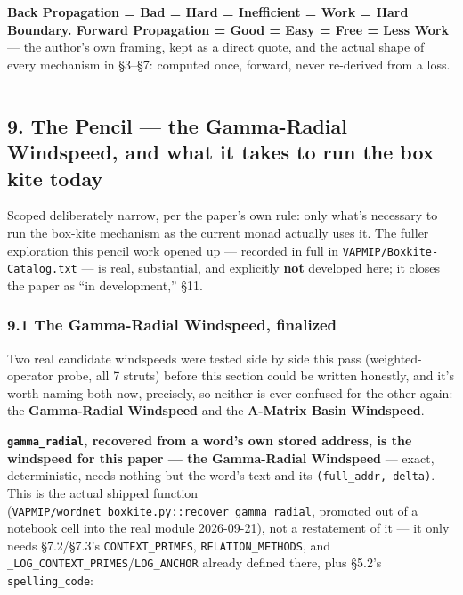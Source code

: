 \documentclass[
  10pt,
]{article}
\begin{document}
\textbf{Back Propagation = Bad = Hard = Inefficient = Work = Hard
Boundary. Forward Propagation = Good = Easy = Free = Less Work} --- the
author's own framing, kept as a direct quote, and the actual shape of
every mechanism in §3--§7: computed once, forward, never re-derived from
a loss.

\begin{center}\rule{0.5\linewidth}{0.5pt}\end{center}

\hypertarget{the-pencil-the-gamma-radial-windspeed-and-what-it-takes-to-run-the-box-kite-today}{%
\subsection{9. The Pencil --- the Gamma-Radial Windspeed, and what it
takes to run the box kite
today}\label{the-pencil-the-gamma-radial-windspeed-and-what-it-takes-to-run-the-box-kite-today}}

Scoped deliberately narrow, per the paper's own rule: only what's
necessary to run the box-kite mechanism as the current monad actually
uses it. The fuller exploration this pencil work opened up --- recorded
in full in \texttt{VAPMIP/Boxkite-Catalog.txt} --- is real, substantial,
and explicitly \textbf{not} developed here; it closes the paper as ``in
development,'' §11.

\hypertarget{the-gamma-radial-windspeed-finalized}{%
\subsubsection{9.1 The Gamma-Radial Windspeed,
finalized}\label{the-gamma-radial-windspeed-finalized}}

Two real candidate windspeeds were tested side by side this pass
(weighted- operator probe, all 7 struts) before this section could be
written honestly, and it's worth naming both now, precisely, so neither
is ever confused for the other again: the \textbf{Gamma-Radial
Windspeed} and the \textbf{A-Matrix Basin Windspeed}.

\textbf{\texttt{gamma\_radial}, recovered from a word's own stored
address, is the windspeed for this paper --- the Gamma-Radial Windspeed}
--- exact, deterministic, needs nothing but the word's text and its
\texttt{(full\_addr,\ delta)}. This is the actual shipped function
(\texttt{VAPMIP/wordnet\_boxkite.py::recover\_gamma\_radial}, promoted
out of a notebook cell into the real module 2026-09-21), not a
restatement of it --- it only needs §7.2/§7.3's
\texttt{CONTEXT\_PRIMES}, \texttt{RELATION\_METHODS}, and
\texttt{\_LOG\_CONTEXT\_PRIMES}/\texttt{LOG\_ANCHOR} already defined
there, plus §5.2's \texttt{spelling\_code}:
\end{document}
